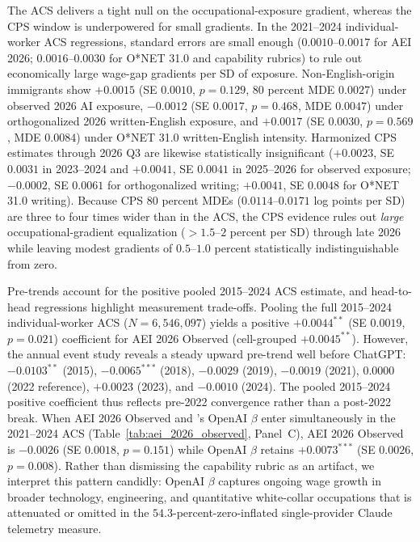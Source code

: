 \documentclass[11pt]{amsart}
\begin{document}
The ACS delivers a tight null on the occupational-exposure gradient, whereas the CPS window is underpowered for small gradients. In the 2021--2024 individual-worker ACS regressions, standard errors are small enough ($0.0010\text{--}0.0017$ for AEI 2026; $0.0016\text{--}0.0030$ for O*NET 31.0 and capability rubrics) to rule out economically large wage-gap gradients per SD of exposure. Non-English-origin immigrants show $+0.0015$ (SE $0.0010$, $p = 0.129$, 80 percent MDE $0.0027$) under observed 2026 AI exposure, $-0.0012$ (SE $0.0017$, $p = 0.468$, MDE $0.0047$) under orthogonalized 2026 written-English exposure, and $+0.0017$ (SE $0.0030$, $p = 0.569$, MDE $0.0084$) under O*NET 31.0 written-English intensity. Harmonized CPS estimates through 2026 Q3 are likewise statistically insignificant ($+0.0023$, SE $0.0031$ in 2023--2024 and $+0.0041$, SE $0.0041$ in 2025--2026 for observed exposure; $-0.0002$, SE $0.0061$ for orthogonalized writing; $+0.0041$, SE $0.0048$ for O*NET 31.0 writing). Because CPS 80 percent MDEs ($0.0114\text{--}0.0171$ log points per SD) are three to four times wider than in the ACS, the CPS evidence rules out \emph{large} occupational-gradient equalization ($>1.5\text{--}2$ percent per SD) through late 2026 while leaving modest gradients of $0.5\text{--}1.0$ percent statistically indistinguishable from zero.

Pre-trends account for the positive pooled 2015--2024 ACS estimate, and head-to-head regressions highlight measurement trade-offs. Pooling the full 2015--2024 individual-worker ACS ($N = 6{,}546{,}097$) yields a positive $+0.0044^{**}$ (SE $0.0019$, $p = 0.021$) coefficient for AEI 2026 Observed (cell-grouped $+0.0045^{**}$). However, the annual event study reveals a steady upward pre-trend well before ChatGPT: $-0.0103^{**}$ (2015), $-0.0065^{***}$ (2018), $-0.0029$ (2019), $-0.0019$ (2021), $0.0000$ (2022 reference), $+0.0023$ (2023), and $-0.0010$ (2024). The pooled 2015--2024 positive coefficient thus reflects pre-2022 convergence rather than a post-2022 break. When AEI 2026 Observed and \citet{Eloundou2024}'s OpenAI $\beta$ enter simultaneously in the 2021--2024 ACS (Table~\ref{tab:aei_2026_observed}, Panel~C), AEI 2026 Observed is $-0.0026$ (SE $0.0018$, $p = 0.151$) while OpenAI $\beta$ retains $+0.0073^{***}$ (SE $0.0026$, $p = 0.008$). Rather than dismissing the capability rubric as an artifact, we interpret this pattern candidly: OpenAI $\beta$ captures ongoing wage growth in broader technology, engineering, and quantitative white-collar occupations that is attenuated or omitted in the $54.3$-percent-zero-inflated single-provider Claude telemetry measure.
\end{document}
